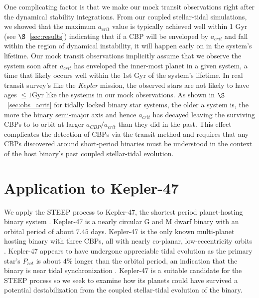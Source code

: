 One complicating factor is that we make our mock transit observations right after the dynamical stability integrations.  From our coupled stellar-tidal \vplanet simulations, we showed that the maximum $a_{crit}$ value is typically achieved well within 1 Gyr (see $\S$~\ref{sec:results}) indicating that if a CBP will be enveloped by $a_{crit}$ and fall within the region of dynamical instability, it will happen early on in the system's lifetime.  Our mock transit observations implicitly assume that we observe the system soon after $a_{crit}$ has enveloped the inner-most planet in a given system, a time that likely occurs well within the 1st Gyr of the system's lifetime.  In real transit survey's like the \textit{Kepler} mission, the observed stars are not likely to have ages $\leq 1 \text{Gyr}$ like the systems in our mock observations.  As shown in $\S$~\ref{sec:obs_acrit} for tidally locked binary star systems, the older a system is, the more the binary semi-major axis and hence $a_{crit}$ has decayed leaving the surviving CBPs to to orbit at larger $a_{CBP}/a_{crit}$ than they did in the past.  This effect complicates the detection of CBPs via the transit method and requires that any CBPs discovered around short-period binaries must be understood in the context of the host binary's past coupled stellar-tidal evolution.


\section{Application to Kepler-47} \label{sec:kepler47}

We apply the STEEP process to Kepler-47, the shortest period planet-hosting binary system \citep{Orosz2012}.  Kepler-47 is a nearly circular G and M dwarf binary with an orbital period of about $7.45$ days.  Kepler-47 is the only known multi-planet hosting binary with three CBPs, all with nearly co-planar, low-eccentricity orbits \citep{Orosz2012,Welsh2015}.  Kepler-47 appears to have undergone appreciable tidal evolution as the primary star's $P_{rot}$ is about $4\%$ longer than the orbital period, an indication that the binary is near tidal synchronization \citep{Orosz2012}.  Kepler-47 is a suitable candidate for the STEEP process so we seek to examine how its planets could have survived a potential destabilization from the coupled stellar-tidal evolution of the binary.  

